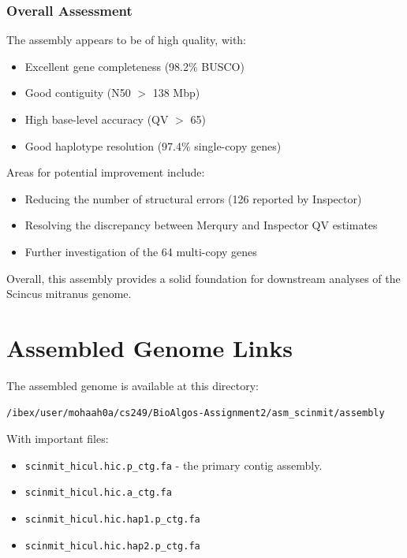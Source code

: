\documentclass[12pt]{article}
\begin{document}
\subsubsection{Overall Assessment}
The assembly appears to be of high quality, with:
\begin{itemize}
    \item Excellent gene completeness (98.2\% BUSCO)
    \item Good contiguity (N50 $>$ 138 Mbp)
    \item High base-level accuracy (QV $>$ 65)
    \item Good haplotype resolution (97.4\% single-copy genes)
\end{itemize}

Areas for potential improvement include:
\begin{itemize}
    \item Reducing the number of structural errors (126 reported by Inspector)
    \item Resolving the discrepancy between Merqury and Inspector QV estimates
    \item Further investigation of the 64 multi-copy genes
\end{itemize}

Overall, this assembly provides a solid foundation for downstream analyses of the Scincus mitranus genome.

\section{Assembled Genome Links}

The assembled genome is available at this directory:

\texttt{/ibex/user/mohaah0a/cs249/BioAlgos-Assignment2/asm\_scinmit/assembly}

With important files:

\begin{itemize}
    \item \texttt{scinmit\_hicul.hic.p\_ctg.fa} - the primary contig assembly.
    \item \texttt{scinmit\_hicul.hic.a\_ctg.fa}
    \item \texttt{scinmit\_hicul.hic.hap1.p\_ctg.fa}
    \item \texttt{scinmit\_hicul.hic.hap2.p\_ctg.fa}
\end{itemize}
\end{document}
